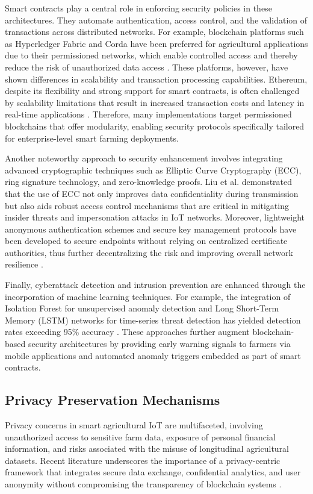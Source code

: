 \documentclass[12pt,onecolumn]{IEEEtran} %
\begin{document}
Smart contracts play a central role in enforcing security policies in these architectures. They automate authentication, access control, and the validation of transactions across distributed networks. For example, blockchain platforms such as Hyperledger Fabric and Corda have been preferred for agricultural applications due to their permissioned networks, which enable controlled access and thereby reduce the risk of unauthorized data access \cite{aliyu2023blockchainbasedsmartfarm, soy2025blockchainintegrationin}. These platforms, however, have shown differences in scalability and transaction processing capabilities. Ethereum, despite its flexibility and strong support for smart contracts, is often challenged by scalability limitations that result in increased transaction costs and latency in real-time applications \cite{aliyu2023blockchainbasedsmartfarm}. Therefore, many implementations target permissioned blockchains that offer modularity, enabling security protocols specifically tailored for enterprise-level smart farming deployments.

Another noteworthy approach to security enhancement involves integrating advanced cryptographic techniques such as Elliptic Curve Cryptography (ECC), ring signature technology, and zero-knowledge proofs. Liu et al. demonstrated that the use of ECC not only improves data confidentiality during transmission but also aids robust access control mechanisms that are critical in mitigating insider threats and impersonation attacks in IoT networks. Moreover, lightweight anonymous authentication schemes and secure key management protocols have been developed to secure endpoints without relying on centralized certificate authorities, thus further decentralizing the risk and improving overall network resilience \cite{rai2024enhancingdatasecurity}.

Finally, cyberattack detection and intrusion prevention are enhanced through the incorporation of machine learning techniques. For example, the integration of Isolation Forest for unsupervised anomaly detection and Long Short-Term Memory (LSTM) networks for time-series threat detection has yielded detection rates exceeding 95\% accuracy \cite{daund2025designofan}. These approaches further augment blockchain-based security architectures by providing early warning signals to farmers via mobile applications and automated anomaly triggers embedded as part of smart contracts.

  \subsection{Privacy Preservation Mechanisms}\label{subsec:privacy}
Privacy concerns in smart agricultural IoT are multifaceted, involving unauthorized access to sensitive farm data, exposure of personal financial information, and risks associated with the misuse of longitudinal agricultural datasets. Recent literature underscores the importance of a privacy-centric framework that integrates secure data exchange, confidential analytics, and user anonymity without compromising the transparency of blockchain systems \cite{rahaman2024privacycentricaiand}.
\end{document}

